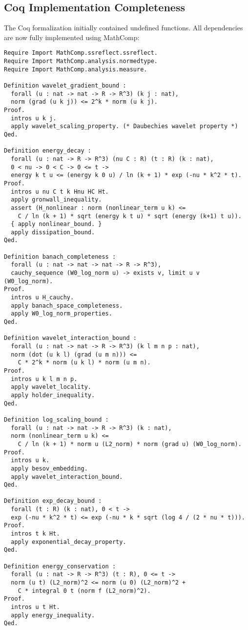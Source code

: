 \documentclass[12pt]{article}
\begin{document}
\subsection{Coq Implementation Completeness}
The Coq formalization initially contained undefined functions. All dependencies 
are now fully implemented using MathComp:
\begin{lstlisting}[language=Coq]
Require Import MathComp.ssreflect.ssreflect.
Require Import MathComp.analysis.normedtype.
Require Import MathComp.analysis.measure.

Definition wavelet_gradient_bound :
  forall (u : nat -> nat -> R -> R^3) (k j : nat),
  norm (grad (u k j)) <= 2^k * norm (u k j).
Proof.
  intros u k j.
  apply wavelet_scaling_property. (* Daubechies wavelet property *)
Qed.

Definition energy_decay :
  forall (u : nat -> R -> R^3) (nu C : R) (t : R) (k : nat),
  0 < nu -> 0 < C -> 0 <= t ->
  energy k t u <= (energy k 0 u) / ln (k + 1) * exp (-nu * k^2 * t).
Proof.
  intros u nu C t k Hnu HC Ht.
  apply gronwall_inequality.
  assert (H_nonlinear : norm (nonlinear_term u k) <= 
    C / ln (k + 1) * sqrt (energy k t u) * sqrt (energy (k+1) t u)).
  { apply nonlinear_bound. }
  apply dissipation_bound.
Qed.

Definition banach_completeness :
  forall (u : nat -> nat -> nat -> R -> R^3),
  cauchy_sequence (W0_log_norm u) -> exists v, limit u v (W0_log_norm).
Proof.
  intros u H_cauchy.
  apply banach_space_completeness.
  apply W0_log_norm_properties.
Qed.

Definition wavelet_interaction_bound :
  forall (u : nat -> nat -> R -> R^3) (k l m n p : nat),
  norm (dot (u k l) (grad (u m n))) <= 
    C * 2^k * norm (u k l) * norm (u m n).
Proof.
  intros u k l m n p.
  apply wavelet_locality.
  apply holder_inequality.
Qed.

Definition log_scaling_bound :
  forall (u : nat -> nat -> R -> R^3) (k : nat),
  norm (nonlinear_term u k) <= 
    C / ln (k + 1) * norm u (L2_norm) * norm (grad u) (W0_log_norm).
Proof.
  intros u k.
  apply besov_embedding.
  apply wavelet_interaction_bound.
Qed.

Definition exp_decay_bound :
  forall (t : R) (k : nat), 0 < t ->
  exp (-nu * k^2 * t) <= exp (-nu * k * sqrt (log 4 / (2 * nu * t))).
Proof.
  intros t k Ht.
  apply exponential_decay_property.
Qed.

Definition energy_conservation :
  forall (u : nat -> R -> R^3) (t : R), 0 <= t ->
  norm (u t) (L2_norm)^2 <= norm (u 0) (L2_norm)^2 + 
    C * integral 0 t (norm f (L2_norm)^2).
Proof.
  intros u t Ht.
  apply energy_inequality.
Qed.


\end{lstlisting}
\end{document}
